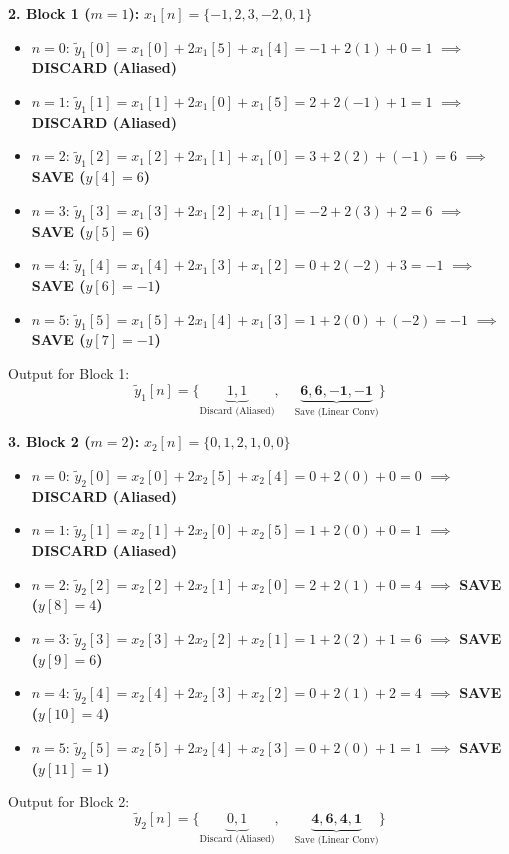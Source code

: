 \documentclass[11pt,a4paper]{article}
\begin{document}
\textbf{2. Block 1 ($m = 1$):} $x_1[n] = \{ -1, 2, 3, -2, 0, 1 \}$
\begin{itemize}
\item $n = 0$: $\tilde{y}_1[0] = x_1[0] + 2x_1[5] + x_1[4] = -1 + 2(1) + 0 = 1$ $\implies$ \textbf{DISCARD (Aliased)}
\item $n = 1$: $\tilde{y}_1[1] = x_1[1] + 2x_1[0] + x_1[5] = 2 + 2(-1) + 1 = 1$ $\implies$ \textbf{DISCARD (Aliased)}
\item $n = 2$: $\tilde{y}_1[2] = x_1[2] + 2x_1[1] + x_1[0] = 3 + 2(2) + (-1) = 6$ $\implies$ \textbf{SAVE ($y[4] = 6$)}
\item $n = 3$: $\tilde{y}_1[3] = x_1[3] + 2x_1[2] + x_1[1] = -2 + 2(3) + 2 = 6$ $\implies$ \textbf{SAVE ($y[5] = 6$)}
\item $n = 4$: $\tilde{y}_1[4] = x_1[4] + 2x_1[3] + x_1[2] = 0 + 2(-2) + 3 = -1$ $\implies$ \textbf{SAVE ($y[6] = -1$)}
\item $n = 5$: $\tilde{y}_1[5] = x_1[5] + 2x_1[4] + x_1[3] = 1 + 2(0) + (-2) = -1$ $\implies$ \textbf{SAVE ($y[7] = -1$)}

\end{itemize}
Output for Block 1:
$$ \tilde{y}_1[n] = \{ \underbrace{1, 1}_{\text{Discard (Aliased)}}, \quad \underbrace{\mathbf{6, 6, -1, -1}}_{\text{Save (Linear Conv)}} \} $$

\textbf{3. Block 2 ($m = 2$):} $x_2[n] = \{ 0, 1, 2, 1, 0, 0 \}$
\begin{itemize}
\item $n = 0$: $\tilde{y}_2[0] = x_2[0] + 2x_2[5] + x_2[4] = 0 + 2(0) + 0 = 0$ $\implies$ \textbf{DISCARD (Aliased)}
\item $n = 1$: $\tilde{y}_2[1] = x_2[1] + 2x_2[0] + x_2[5] = 1 + 2(0) + 0 = 1$ $\implies$ \textbf{DISCARD (Aliased)}
\item $n = 2$: $\tilde{y}_2[2] = x_2[2] + 2x_2[1] + x_2[0] = 2 + 2(1) + 0 = 4$ $\implies$ \textbf{SAVE ($y[8] = 4$)}
\item $n = 3$: $\tilde{y}_2[3] = x_2[3] + 2x_2[2] + x_2[1] = 1 + 2(2) + 1 = 6$ $\implies$ \textbf{SAVE ($y[9] = 6$)}
\item $n = 4$: $\tilde{y}_2[4] = x_2[4] + 2x_2[3] + x_2[2] = 0 + 2(1) + 2 = 4$ $\implies$ \textbf{SAVE ($y[10] = 4$)}
\item $n = 5$: $\tilde{y}_2[5] = x_2[5] + 2x_2[4] + x_2[3] = 0 + 2(0) + 1 = 1$ $\implies$ \textbf{SAVE ($y[11] = 1$)}

\end{itemize}
Output for Block 2:
$$ \tilde{y}_2[n] = \{ \underbrace{0, 1}_{\text{Discard (Aliased)}}, \quad \underbrace{\mathbf{4, 6, 4, 1}}_{\text{Save (Linear Conv)}} \} $$
\end{document}
